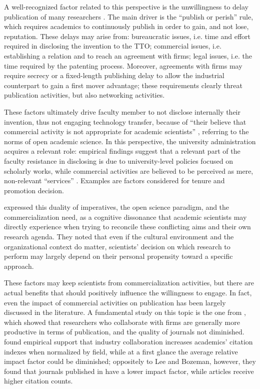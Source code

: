 A well-recognized factor related to this perspective is the unwillingness to delay publication of many researchers \citep{Thursby2002, OShea2004, Baldini2007}. The main driver is the \enquote{publish or perish} rule, which requires academics to continuously publish in order to gain, and not lose, reputation. These delays may arise from: bureaucratic issues, i.e. time and effort required in disclosing the invention to the TTO; commercial issues, i.e. establishing a relation and to reach an agreement with firms; legal issues, i.e. the time required by the patenting process. Moreover, agreements with firms may require secrecy or a fixed-length publishing delay to allow the industrial counterpart to gain a first mover advantage; these requirements clearly threat publication activities, but also networking activities. 

These factors ultimately drive faculty member to not disclose internally their invention, thus not engaging technology transfer, because of \enquote{their believe that commercial activity is not appropriate for academic scientists} \citep{Bercovitz2006}, referring to the norms of open academic science.  In this perspective, the university administration acquires a relevant role: empirical findings suggest that a relevant part of the faculty resistance in disclosing is due to university-level policies focused on scholarly works, while commercial activities are believed to be perceived as mere, non-relevant \enquote{services} \citep{Markman2005}. Examples are factors considered for tenure and promotion decision.

\citet{Muscio2013} expressed this duality of imperatives, the open science paradigm, and the commercialization need, as a cognitive dissonance that academic scientists may directly experience when trying to reconcile these conflicting aims and their own research agenda. They noted that even if the cultural environment and the organizational context do matter, scientists' decision on which research to perform may largely depend on their personal propensity toward a specific approach.

These factors may keep scientists from commercialization activities, but there are actual benefits that should positively influence the willingness to engage. In fact, even the impact of commercial activities on publication has been largely discussed in the literature. A fundamental study on this topic is the one from \citet{Lee2005}, which showed that researchers who collaborate with firms are generally more productive in terms of publication, and the quality of journals not diminished. \citet{Lebeau2008} found empirical support that industry collaboration increases academics' citation indexes when normalized by field, while at a first glance the average relative impact factor could be diminished; oppositely to Lee and Bozeman, however, they found that journals published in have a lower impact factor, while articles receive higher citation counts.

